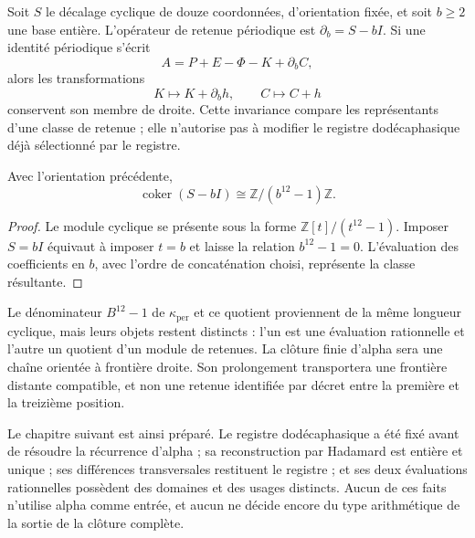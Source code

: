 Soit \(S\) le décalage cyclique de douze coordonnées, d'orientation fixée, et soit \(b\geq2\) une base entière. L'opérateur de retenue périodique est \(\partial_b=S-bI\). Si une identité périodique s'écrit
\[
 A=P+E-\Phi-K+\partial_bC,
\]
alors les transformations
\[
 K\longmapsto K+\partial_bh,\qquad C\longmapsto C+h
\]
conservent son membre de droite. Cette invariance compare les représentants d'une
classe de retenue ; elle n'autorise pas à modifier le registre dodécaphasique déjà
sélectionné par le registre.

\begin{proposition}
\label{prop:k-cociente-acarreo}
Avec l'orientation précédente,
\[
 \operatorname{coker}(S-bI)\cong\mathbb Z/(b^{12}-1)\mathbb Z.
\]
\end{proposition}

\begin{proof}
Le module cyclique se présente sous la forme
\(\mathbb Z[t]/(t^{12}-1)\). Imposer \(S=bI\) équivaut à imposer
\(t=b\) et laisse la relation \(b^{12}-1=0\). L'évaluation des
coefficients en \(b\), avec l'ordre de concaténation choisi, représente
la classe résultante.
\end{proof}

Le dénominateur \(B^{12}-1\) de \(\kappa_{\mathrm{per}}\) et ce quotient proviennent de la même longueur cyclique, mais leurs objets restent distincts : l'un est une évaluation rationnelle et l'autre un quotient d'un module de retenues. La clôture finie d'alpha sera une chaîne orientée à frontière droite. Son prolongement transportera une frontière distante compatible, et non une retenue identifiée par décret entre la première et la treizième position.

Le chapitre suivant est ainsi préparé. Le registre dodécaphasique a été fixé avant
de résoudre la récurrence d'alpha ; sa reconstruction par Hadamard est
entière et unique ; ses différences transversales restituent le registre ; et
ses deux évaluations rationnelles possèdent des domaines et des usages distincts. Aucun
de ces faits n'utilise alpha comme entrée, et aucun ne décide encore du
type arithmétique de la sortie de la clôture complète.
